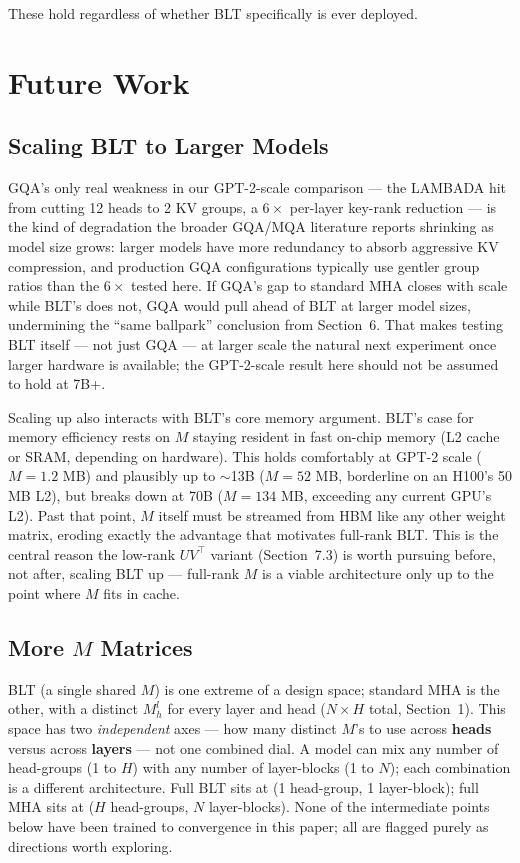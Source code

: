 \documentclass[11pt]{article}
\begin{document}
These hold regardless of whether BLT specifically is ever deployed.

\section{Future Work}

\subsection{Scaling BLT to Larger Models}

GQA's only real weakness in our GPT-2-scale comparison --- the LAMBADA hit from cutting 12 heads to 2 KV groups, a $6\times$ per-layer key-rank reduction --- is the kind of degradation the broader GQA/MQA literature reports shrinking as model size grows: larger models have more redundancy to absorb aggressive KV compression, and production GQA configurations typically use gentler group ratios than the $6\times$ tested here. If GQA's gap to standard MHA closes with scale while BLT's does not, GQA would pull ahead of BLT at larger model sizes, undermining the ``same ballpark'' conclusion from Section~6. That makes testing BLT itself --- not just GQA --- at larger scale the natural next experiment once larger hardware is available; the GPT-2-scale result here should not be assumed to hold at 7B+.

Scaling up also interacts with BLT's core memory argument. BLT's case for memory efficiency rests on $M$ staying resident in fast on-chip memory (L2 cache or SRAM, depending on hardware). This holds comfortably at GPT-2 scale ($M = 1.2$ MB) and plausibly up to $\sim$13B ($M = 52$ MB, borderline on an H100's 50 MB L2), but breaks down at 70B ($M = 134$ MB, exceeding any current GPU's L2). Past that point, $M$ itself must be streamed from HBM like any other weight matrix, eroding exactly the advantage that motivates full-rank BLT. This is the central reason the low-rank $UV^\top$ variant (Section~7.3) is worth pursuing before, not after, scaling BLT up --- full-rank $M$ is a viable architecture only up to the point where $M$ fits in cache.

\subsection{More $M$ Matrices}

BLT (a single shared $M$) is one extreme of a design space; standard MHA is the other, with a distinct $M_h^l$ for every layer and head ($N\times H$ total, Section~1). This space has two \emph{independent} axes --- how many distinct $M$'s to use across \textbf{heads} versus across \textbf{layers} --- not one combined dial. A model can mix any number of head-groups (1 to $H$) with any number of layer-blocks (1 to $N$); each combination is a different architecture. Full BLT sits at (1 head-group, 1 layer-block); full MHA sits at ($H$ head-groups, $N$ layer-blocks). None of the intermediate points below have been trained to convergence in this paper; all are flagged purely as directions worth exploring.
\end{document}

